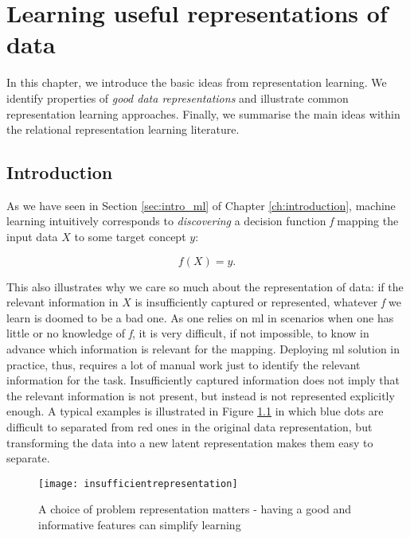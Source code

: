 \chapter{Learning useful representations of data}\label{ch:learningrepresentations}



In this chapter, we introduce the basic ideas from representation learning.
We identify properties of \textit{good data representations} and illustrate common representation learning approaches.
Finally, we summarise the main ideas within the relational representation learning literature.



\section{Introduction}


As we have seen in Section \ref{sec:intro_ml} of Chapter \ref{ch:introduction}, machine learning intuitively corresponds to \textit{discovering} a decision function \textit{f} mapping the input data $X$ to some target concept $y$:

\begin{equation}
	f(X) = y.
	\label{eq:ml}
\end{equation}


This also illustrates why we care so much about the representation of data: if the relevant information in $X$ is insufficiently captured or represented, whatever \textit{f} we learn  is doomed to be a bad one.
As one relies on \gls{ml} in scenarios when one has little or no knowledge of \textit{f}, it is very difficult, if not impossible, to know in advance which information is relevant for the mapping.
Deploying \gls{ml} solution in practice, thus, requires a lot of manual work just to identify the relevant information for the task.
Insufficiently captured information does not imply that the relevant information is not present, but instead is not represented explicitly enough.
A typical examples is illustrated in Figure \ref{fig:transform} in which blue dots are difficult to separated from red ones in the original data representation, but transforming the data into a new latent representation makes them easy to separate.


\begin{figure}
	\centering
	\texttt{[image: insufficientrepresentation]}
	\caption[A choice of problem representation matters]{A choice of problem representation matters - having a good and informative features can simplify learning\label{fig:transform}}
\end{figure}

